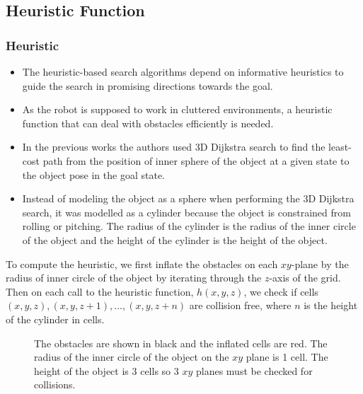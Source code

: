 \documentclass{beamer}
\begin{document}
\subsection{Heuristic Function} 
\begin{frame}
\frametitle{Heuristic}
\begin{itemize} 
  \item The heuristic-based search algorithms depend on informative heuristics
  to guide the search in promising directions towards the goal.
  \item As the robot is supposed to work in cluttered environments, a heuristic
  function that can deal with obstacles efficiently is needed.
  \item In the previous works the authors used 3D Dijkstra search to find the
  least-cost path from the position of inner sphere of the object at a given state to the object pose in the goal state.
  \item Instead of modeling the object as a sphere when performing the 3D
  Dijkstra search, it was modelled as a cylinder because the object is constrained from rolling or pitching. The radius of the cylinder
  is the radius of the inner circle of the object and the height of the cylinder is the height
of the object.
\end{itemize}
\end{frame}

\begin{frame}
 To compute the heuristic, we first inflate the obstacles on
each $xy$-plane by the radius of inner circle of the object
by iterating through the $z$-axis of the grid. Then on each
call to the heuristic function, $h(x,y,z)$, we check if cells
$(x,y,z),(x,y,z+1), ... ,(x,y,z+n)$ are collision free, where $n$ is
the height of the cylinder in cells.
\begin{figure}[]
\centering
{}
\caption[Optional caption for list of figures]{The obstacles are shown in black and the inflated
cells are red. The radius of the inner circle of the object on
the $xy$ plane is 1 cell. The height of the object is 3 cells so
3 $xy$ planes must be checked for collisions.}
\label{fig:subfigureExample}
\end{figure}
\end{frame}
\end{document}
